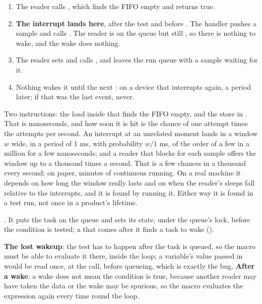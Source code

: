 
\begin{enumerate}
  \item The reader calls , which finds the FIFO empty and returns true.
  \item \textbf{The interrupt lands here}, after the test and before . The
    handler pushes a sample and calls . The reader is on the queue but
    still , so there is nothing to wake, and the wake does nothing.
  \item The reader sets  and calls , and leaves the run
    queue with a sample waiting for it.
  \item Nothing wakes it until the next : on a device that interrupts again, a period
    later; if that was the last event, never.
\end{enumerate}

 Two instructions: the load inside  that finds the FIFO empty, and the
store in . That is nanoseconds, and how soon it is hit is the chance of one
attempt times the attempts per second. An interrupt at an unrelated moment lands in a window $w$
wide, in a period of 1 ms, with probability $w / 1$ ms, of the order of a few in a million for a few
nanoseconds; and a reader that blocks for each sample offers the window up to a thousand times a
second. That is a few chances in a thousand every second: on paper, minutes of continuous running.
On a real machine it depends on how long the window really lasts and on when the reader's sleeps
fall relative to the interrupts, and it is found by running it. Either way it is found in a test
run, not once in a product's lifetime.

 . It puts the task
on the queue and sets its state, under the queue's lock, before the condition is tested; a
 that comes after it finds a task to wake ().

 \textbf{The lost wakeup}: the test has to happen after the task is queued, so the macro
must be able to evaluate it there, inside the loop; a variable's value passed in would be read once,
at the call, before queueing, which is exactly the bug. \textbf{After a wake}: a wake does not mean
the condition is true, because another reader may have taken the data or the wake may be spurious,
so the macro evaluates the expression again every time round the loop.

